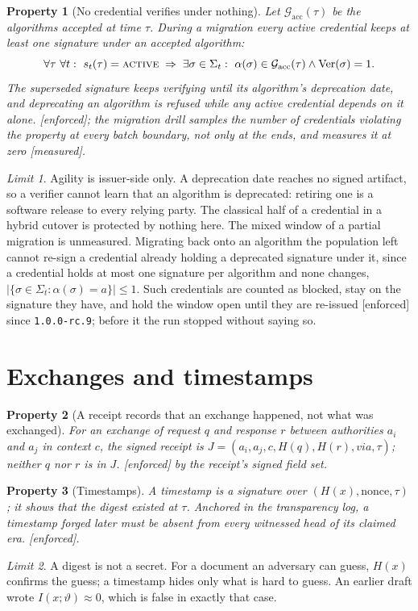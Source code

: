 \documentclass[11pt]{article}
\newtheorem{property}{Property}
\theoremstyle{remark}
\newtheorem*{limit}{Limit}
\newcommand{\Alg}{\mathcal G}
\newcommand{\Hs}{H}
\newcommand{\code}[1]{\texttt{#1}}
\newcommand{\emark}[1]{\textup{\textsf{[#1]}}}
\newcommand{\st}[1]{\textup{\textsc{#1}}}
\begin{document}
\begin{property}[No credential verifies under nothing] Let $\Alg_{\mathrm{acc}}(\tau)$ be the algorithms
accepted at time $\tau$. During a migration every active credential keeps at least one signature under
an accepted algorithm:
\[
\forall\tau\ \forall t:\ s_t(\tau)=\st{active}\;\Rightarrow\;\exists\sigma\in\Sigma_t:\
\alpha(\sigma)\in\Alg_{\mathrm{acc}}(\tau)\wedge \mathrm{Ver}(\sigma)=1 .
\]
The superseded signature keeps verifying until its algorithm's deprecation date, and deprecating an
algorithm is refused while any active credential depends on it alone. \emark{enforced}; the migration
drill samples the number of credentials violating the property at every batch boundary, not only at
the ends, and measures it at zero \emark{measured}.
\end{property}
\begin{limit}
Agility is issuer-side only. A deprecation date reaches no signed artifact, so a verifier cannot
learn that an algorithm is deprecated: retiring one is a software release to every relying party. The
classical half of a credential in a hybrid cutover is protected by nothing here. The mixed window of
a partial migration is unmeasured. Migrating back onto an algorithm the population left cannot re-sign
a credential already holding a deprecated signature under it, since a credential holds at most one
signature per algorithm and none changes, $|\{\sigma\in\Sigma_t:\alpha(\sigma)=a\}|\le 1$. Such
credentials are counted as blocked, stay on the signature they have, and hold the window open until
they are re-issued \emark{enforced} since \code{1.0.0-rc.9}; before it the run stopped without saying so.
\end{limit}

\section{Exchanges and timestamps}

\begin{property}[A receipt records that an exchange happened, not what was exchanged] For an exchange
of request $q$ and response $r$ between authorities $a_i$ and $a_j$ in context $c$, the signed receipt
is $J=(a_i,a_j,c,\Hs(q),\Hs(r),\mathit{via},\tau)$; neither $q$ nor $r$ is in $J$. \emark{enforced} by
the receipt's signed field set.
\end{property}

\begin{property}[Timestamps] A timestamp is a signature over $(\Hs(x),\text{nonce},\tau)$; it shows
that the digest existed at $\tau$. Anchored in the transparency log, a timestamp forged later must be
absent from every witnessed head of its claimed era. \emark{enforced}.
\end{property}
\begin{limit}
A digest is not a secret. For a document an adversary can guess, $\Hs(x)$ confirms the guess; a
timestamp hides only what is hard to guess. An earlier draft wrote $I(x;\vartheta)\approx0$, which is
false in exactly that case.
\end{limit}
\end{document}
